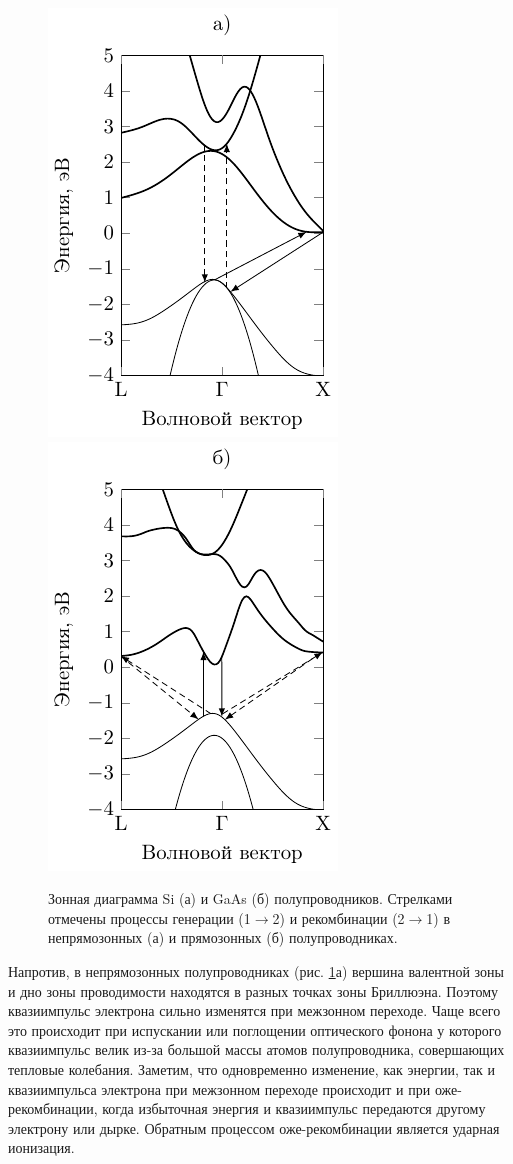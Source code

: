 \begin{figure}[h!]
	\centering
	\includegraphics[width = .35\linewidth]{fig/diag}
	\includegraphics[width = .35\linewidth]{fig/diag2}
	\caption{Зонная диаграмма Si (а) и GaAs (б) полупроводников. 
Стрелками отмечены процессы генерации (1$\to$2) и рекомбинации (2$\to$1) в непрямозонных (а) и прямозонных (б)
полупроводниках.}
	\label{fig:figure2}
\end{figure}
% 

Напротив, в непрямозонных полупроводниках (рис.  \ref{fig:figure2}а) вершина валентной зоны и дно зоны проводимости
находятся в разных точках зоны Бриллюэна. Поэтому квазиимпульс электрона сильно изменятся при межзонном переходе. Чаще
всего это происходит при испускании или поглощении оптического фонона у которого квазиимпульс велик из-за большой массы
атомов полупроводника, совершающих тепловые колебания. Заметим, что одновременно изменение, как энергии, так и
квазиимпульса электрона при межзонном переходе происходит и при оже-рекомбинации, когда избыточная энергия и
квазиимпульс передаются другому электрону или дырке. Обратным процессом оже-рекомбинации является ударная ионизация.




